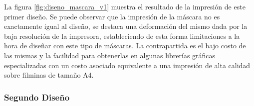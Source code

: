 		      La figura \ref{fig:diseno_mascara_v1} muestra el resultado de la impresión de este primer diseño. Se puede observar que la impresión de la máscara no es exactamente igual al diseño, se destaca una deformación del mismo dada por la baja resolución de la impresora, estableciendo de esta forma limitaciones a la hora de diseñar con este tipo de máscaras. La contrapartida es el bajo costo de las mismas y la facilidad para obtenerlas en algunas librerías gráficas especializadas con un costo asociado equivalente a una impresión de alta calidad sobre filminas de tamaño A4.
		
 		 \subsubsection{Segundo Diseño}

